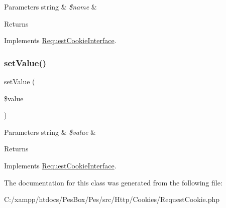 \begin{DoxyParams}[1]{Parameters}
string & {\em \$name} & \\
\hline
\end{DoxyParams}
\begin{DoxyReturn}{Returns}

\end{DoxyReturn}


Implements \mbox{\hyperlink{interface_pes_1_1_http_1_1_cookies_1_1_request_cookie_interface}{Request\+Cookie\+Interface}}.

\mbox{\label{class_pes_1_1_http_1_1_cookies_1_1_request_cookie_a7494441b6ed08a391704971873f31432}} 
\subsubsection{\texorpdfstring{set\+Value()}{setValue()}}
{\footnotesize\ttfamily set\+Value (\begin{DoxyParamCaption}\item[{}]{\$value }\end{DoxyParamCaption})}


\begin{DoxyParams}[1]{Parameters}
string & {\em \$value} & \\
\hline
\end{DoxyParams}
\begin{DoxyReturn}{Returns}

\end{DoxyReturn}


Implements \mbox{\hyperlink{interface_pes_1_1_http_1_1_cookies_1_1_request_cookie_interface}{Request\+Cookie\+Interface}}.



The documentation for this class was generated from the following file\+:\begin{DoxyCompactItemize}
\item 
C\+:/xampp/htdocs/\+Pes\+Box/\+Pes/src/\+Http/\+Cookies/Request\+Cookie.\+php\end{DoxyCompactItemize}
